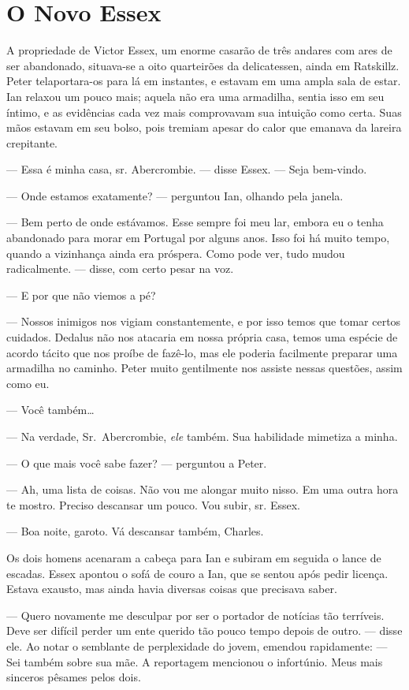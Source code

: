 \chapter{O Novo Essex}

A propriedade de Victor Essex, um enorme casarão de três andares com ares de
ser abandonado, situava-se a oito quarteirões da delicatessen, ainda em
Ratskillz. Peter telaportara-os para lá em instantes, e estavam em uma ampla
sala de estar. Ian relaxou um pouco mais; aquela não era uma armadilha, sentia
isso em seu íntimo, e as evidências cada vez mais comprovavam sua intuição como
certa. Suas mãos estavam em seu bolso, pois tremiam apesar do calor que emanava
da lareira crepitante.

--- Essa é minha casa, sr. Abercrombie. --- disse Essex. --- Seja bem-vindo.

--- Onde estamos exatamente? --- perguntou Ian, olhando pela janela.

--- Bem perto de onde estávamos. Esse sempre foi meu lar, embora eu o tenha
abandonado para morar em Portugal por alguns anos. Isso foi há muito tempo,
quando a vizinhança ainda era próspera. Como pode ver, tudo mudou radicalmente.
--- disse, com certo pesar na voz.

--- E por que não viemos a pé?

--- Nossos inimigos nos vigiam constantemente, e por isso temos que tomar
certos cuidados. Dedalus não nos atacaria em nossa própria casa, temos uma
espécie de acordo tácito que nos proíbe de fazê-lo, mas ele poderia facilmente
preparar uma armadilha no caminho. Peter muito gentilmente nos assiste nessas
questões, assim como eu.

--- Você também\ldots

--- Na verdade, Sr.~Abercrombie, \emph{ele} também. Sua habilidade mimetiza a
minha.

--- O que mais você sabe fazer? --- perguntou a Peter.

--- Ah, uma lista de coisas. Não vou me alongar muito nisso. Em uma outra hora
te mostro. Preciso descansar um pouco. Vou subir, sr. Essex.

--- Boa noite, garoto. Vá descansar também, Charles.

Os dois homens acenaram a cabeça para Ian e subiram em seguida o lance de
escadas. Essex apontou o sofá de couro a Ian, que se sentou após pedir licença.
Estava exausto, mas ainda havia diversas coisas que precisava saber.

--- Quero novamente me desculpar por ser o portador de notícias tão terríveis.
Deve ser difícil perder um ente querido tão pouco tempo depois de outro. ---
disse ele. Ao notar o semblante de perplexidade do jovem, emendou rapidamente:
--- Sei também sobre sua mãe. A reportagem mencionou o infortúnio. Meus mais
sinceros pêsames pelos dois.


